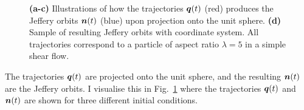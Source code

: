 \documentclass[thesis.tex]{subfiles}
\begin{document}
\begin{figure}
\begin{center}
{        }
	\end{center}
    \caption{\textbf{(a-c)} Illustrations of how the trajectories $\mbox{\boldmath$q$}(t)$ (red) produces the Jeffery orbits $\mbox{\boldmath$n$}(t)$ (blue) upon projection onto the unit sphere. \textbf{(d)} Sample of resulting Jeffery orbits with coordinate system. All trajectories correspond to a particle of aspect ratio $\lambda=5$ in a simple shear flow.}\label{fig:projection_orbits}
\end{figure}


The trajectories $\mbox{\boldmath$q$}(t)$ are projected onto the unit sphere, and the resulting $\mbox{\boldmath$n$}(t)$ are the Jeffery orbits. I visualise this in Fig.~\ref{fig:projection_orbits} where the trajectories $\mbox{\boldmath$q$}(t)$ and $\mbox{\boldmath$n$}(t)$ are shown for three different initial conditions.
\end{document}
